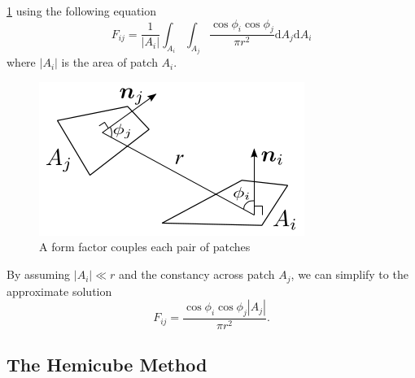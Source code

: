 \documentclass[twocolumn,landscape,10pt]{article}
\theoremstyle{definition}
\begin{document}
\begin{itemize}
        \ref{fig:form_factor} using the following equation
        \[
            F_{ij}=\frac{1}{|A_{i}|}\int_{A_i}\int_{A_j}
            \frac{\cos{\phi_i}\cos{\phi_j}}{\pi r^2}
            \mathrm{d}A_j\mathrm{d}A_i
        \]
        where $|A_i|$ is the area of patch $A_i$.
        \begin{figure}[h]
          	\includegraphics[scale=0.7]{form_factor.png}
          	\centering
          	\caption{A form factor couples each pair of
            patches}\label{fig:form_factor}
        \end{figure}
        By assuming $|A_i|\ll r$ and the constancy across patch $A_j$,
        we can simplify to the approximate solution
        \[
            F_{ij}=\frac{\cos{\phi_i}\cos{\phi_j}|A_j|}{\pi r^2}.
        \]
\end{itemize} 

\subsection{The Hemicube Method}
\end{document}
